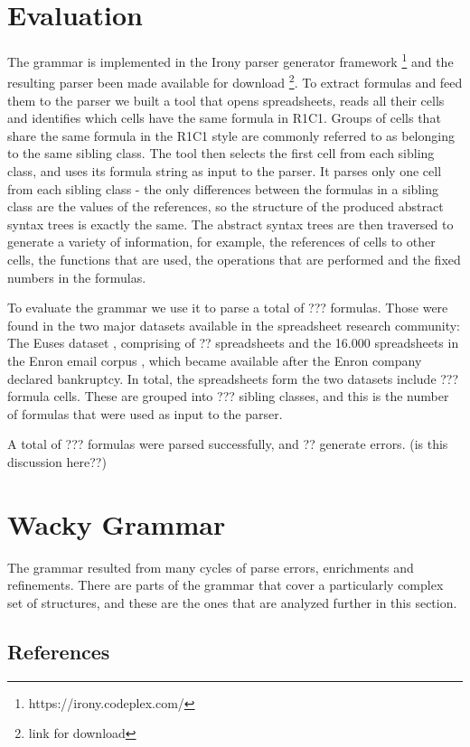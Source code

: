 \documentclass[conference]{IEEEtran}
\begin{document}
\section{Evaluation}
The grammar is implemented in the Irony parser generator framework \footnote{https://irony.codeplex.com/} and the resulting parser been made available for download \footnote{link for download}. To extract formulas and feed them to the parser we built a tool that opens spreadsheets, reads all their cells and identifies which cells have the same formula in R1C1. Groups of cells that share the same formula in the R1C1 style are commonly referred to as belonging to the same sibling class. The tool then selects the first cell from each sibling class, and uses its formula string as input to the parser. It parses only one cell from each sibling class - the only differences between the formulas in a sibling class are the values of the references, so the structure of the produced abstract syntax trees is exactly the same. The abstract syntax trees are then traversed to generate a variety of information, for example, the references of cells to other cells, the functions that are used, the operations that are performed and the fixed numbers in the formulas.

To evaluate the grammar we use it to parse a total of ??? formulas. Those were found in the two major datasets available in the spreadsheet research community: The Euses dataset \cite{euses}, comprising of ?? spreadsheets and the 16.000 spreadsheets in the Enron email corpus \cite{enron}, which became available after the Enron company declared bankruptcy. In total, the spreadsheets form the two datasets include ??? formula cells. These are grouped into ??? sibling classes, and this is the number of formulas that were used as input to the parser.

A total of ??? formulas were parsed successfully, and ?? generate errors. (is this discussion here??)

\section{Wacky Grammar}

The grammar resulted from many cycles of parse errors, enrichments and refinements. There are parts of the grammar that cover a particularly complex set of structures, and these are the ones that are analyzed further in this section.

\subsection{References}
 
\end{document}
